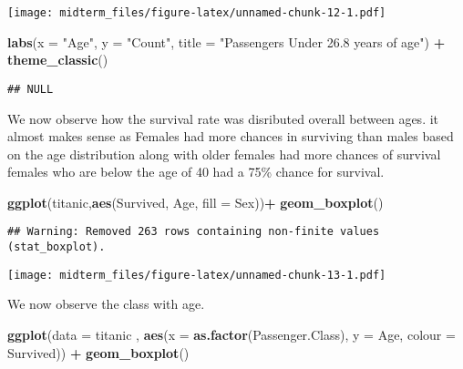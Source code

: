 \documentclass[]{article}
\newenvironment{Shaded}{\begin{snugshade}}{\end{snugshade}}
\newcommand{\DataTypeTok}[1]{\textcolor[rgb]{0.13,0.29,0.53}{#1}}
\newcommand{\KeywordTok}[1]{\textcolor[rgb]{0.13,0.29,0.53}{\textbf{#1}}}
\newcommand{\NormalTok}[1]{#1}
\newcommand{\OperatorTok}[1]{\textcolor[rgb]{0.81,0.36,0.00}{\textbf{#1}}}
\newcommand{\StringTok}[1]{\textcolor[rgb]{0.31,0.60,0.02}{#1}}
\begin{document}
\texttt{[image: midterm\_files/figure-latex/unnamed-chunk-12-1.pdf]}

\begin{Shaded}
\begin{Highlighting}[]
        \KeywordTok{labs}\NormalTok{(}\DataTypeTok{x =} \StringTok{"Age"}\NormalTok{, }\DataTypeTok{y =} \StringTok{"Count"}\NormalTok{, }\DataTypeTok{title =} \StringTok{"Passengers Under 26.8 years of age"}\NormalTok{) }\OperatorTok{+}
\StringTok{          }\KeywordTok{theme_classic}\NormalTok{()}
\end{Highlighting}
\end{Shaded}

\begin{verbatim}
## NULL
\end{verbatim}

We now observe how the survival rate was disributed overall between
ages. it almost makes sense as Females had more chances in surviving
than males based on the age distribution along with older females had
more chances of survival females who are below the age of 40 had a 75\%
chance for survival.

\begin{Shaded}
\begin{Highlighting}[]
\KeywordTok{ggplot}\NormalTok{(titanic,}\KeywordTok{aes}\NormalTok{(Survived, Age, }\DataTypeTok{fill =}\NormalTok{ Sex))}\OperatorTok{+}
\StringTok{  }\KeywordTok{geom_boxplot}\NormalTok{()}
\end{Highlighting}
\end{Shaded}

\begin{verbatim}
## Warning: Removed 263 rows containing non-finite values (stat_boxplot).
\end{verbatim}

\texttt{[image: midterm\_files/figure-latex/unnamed-chunk-13-1.pdf]}

We now observe the class with age.

\begin{Shaded}
\begin{Highlighting}[]
\KeywordTok{ggplot}\NormalTok{(}\DataTypeTok{data =}\NormalTok{ titanic , }\KeywordTok{aes}\NormalTok{(}\DataTypeTok{x =} \KeywordTok{as.factor}\NormalTok{(Passenger.Class), }
                            \DataTypeTok{y =}\NormalTok{ Age, }\DataTypeTok{colour =}\NormalTok{ Survived)) }\OperatorTok{+}
\KeywordTok{geom_boxplot}\NormalTok{()}
\end{Highlighting}
\end{Shaded}
\end{document}
